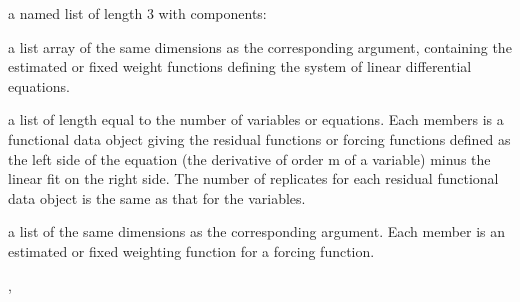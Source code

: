 \begin{Value}
a named list of length 3 with components:

\begin{ldescription}
\item[\code{bwtlist}] a list array of the same dimensions as the
corresponding argument, containing the estimated or fixed weight
functions defining the system of linear differential equations.

\item[\code{resfdlist}] a list of length equal to the number of variables
or equations.  Each members is a functional data object giving the
residual functions or forcing functions defined as the left side
of the equation (the derivative of order m of a variable) minus
the linear fit on the right side.  The number of replicates for each
residual functional data object is the same as that for the variables.

\item[\code{awtlist}] a list of the same dimensions as the corresponding
argument.  Each member is an estimated or fixed weighting function for
a forcing function.

\end{ldescription}
\end{Value}
\begin{SeeAlso}\relax
{}, 
\end{SeeAlso}
